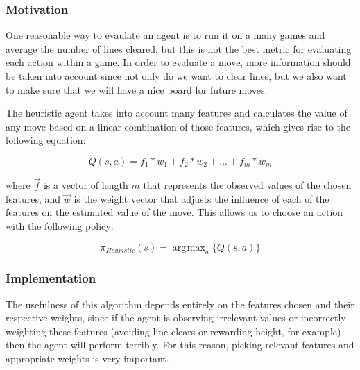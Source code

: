 \documentclass{article}
\DeclareMathOperator*{\argmax}{arg\!\max}
\begin{document}
\subsubsection{Motivation}
One reasonable way to evaulate an agent is to run it on a many games and average the number of lines cleared, but this is not the best metric for evaluating each action within a game. In order to evaluate a move, more information should be taken into account since not only do we want to clear lines, but we also want to make sure that we will have a nice board for future moves.

The heuristic agent takes into account many features and calculates the value of any move based on a linear combination of those features, which gives rise to the following equation:

\begin{equation} \label{heuristiclc}
Q(s,a) = f_{1}*w_{1} + f_{2}*w_{2} + \dots + f_{m}*w_{m}
\end{equation}

where \(\vec{f}\) is a vector of length \(m\) that represents the observed values of the chosen features, and \(\vec{w}\) is the weight vector that adjusts the influence of each of the features on the estimated value of the move. This allows us to choose an action with the following policy:

\begin{equation} \label{heuristiceq}
\pi_{Heuristic}(s) = \argmax_a \{ Q(s,a) \}
\end{equation}

\subsubsection{Implementation}
The usefulness of this algorithm depends entirely on the features chosen and their respective weights, since if the agent is observing irrelevant values or incorrectly weighting these features (avoiding line clears or rewarding height, for example) then the agent will perform terribly. For this reason, picking relevant features and appropriate weights is very important.
\end{document}
